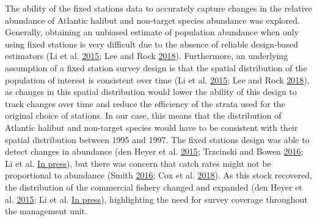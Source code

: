 \documentclass[12pt]{article}\usepackage[]{graphicx}\usepackage[]{color}
\begin{document}
The ability of the fixed stations data to accurately capture changes in the relative abundance of Atlantic halibut and non-target species abundance was explored. Generally, obtaining an unbiased estimate of population abundance when only using fixed stations is very difficult due to the absence of reliable design-based estimators (Li et al. \protect\hyperlink{ref-Li2015}{2015}; Lee and Rock \protect\hyperlink{ref-Lee2018}{2018}). Furthermore, an underlying assumption of a fixed station survey design is that the spatial distribution of the population of interest is consistent over time (Li et al. \protect\hyperlink{ref-Li2015}{2015}; Lee and Rock \protect\hyperlink{ref-Lee2018}{2018}), as changes in this spatial distribution would lower the ability of this design to track changes over time and reduce the efficiency of the strata used for the original choice of stations. In our case, this means that the distribution of Atlantic halibut and non-target species would have to be consistent with their spatial distribution between 1995 and 1997. The fixed stations design was able to detect changes in abundance (den Heyer et al. \protect\hyperlink{ref-DenHeyer2015}{2015}; Trzcinski and Bowen \protect\hyperlink{ref-Trzcinski2016}{2016}; Li et al. \protect\hyperlink{ref-Li2022}{In press}), but there was concern that catch rates might not be proportional to abundance (Smith \protect\hyperlink{ref-Smith2016a}{2016}; Cox et al. \protect\hyperlink{ref-Cox2018}{2018}). As this stock recovered, the distribution of the commercial fishery changed and expanded (den Heyer et al. \protect\hyperlink{ref-DenHeyer2015}{2015}; Li et al. \protect\hyperlink{ref-Li2022}{In press}), highlighting the need for survey coverage throughout the management unit.
\end{document}
